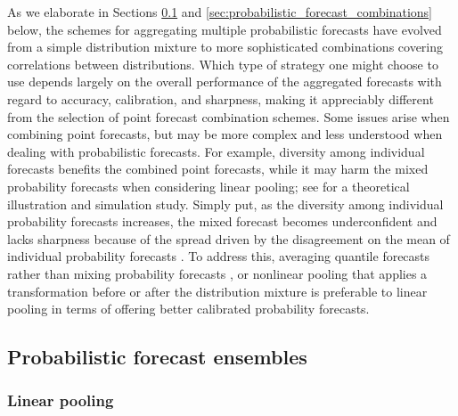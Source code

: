 \documentclass[11pt]{article}
\begin{document}
As we elaborate in Sections \ref{sec:probabilistic_forecast_ensembles} and \ref{sec:probabilistic_forecast_combinations} below, the schemes for aggregating multiple probabilistic forecasts have evolved from a simple distribution mixture to more sophisticated combinations covering correlations between distributions. Which type of strategy one might choose to use depends largely on the overall performance of the aggregated forecasts with regard to accuracy, calibration, and sharpness, making it appreciably different from the selection of point forecast combination schemes. Some issues arise when combining point forecasts, but may be more complex and less understood when dealing with probabilistic forecasts. For example, diversity among individual forecasts benefits the combined point forecasts, while it may harm the mixed probability forecasts when considering linear pooling; see \cite{Ranjan2010-jl} for a theoretical illustration and simulation study. Simply put, as the diversity among individual probability forecasts increases, the mixed forecast becomes underconfident and lacks sharpness because of the spread driven by the disagreement on the mean of individual probability forecasts \citep{Hora2004-fz,Wallis2005-yf,Ranjan2010-jl}. To address this, averaging quantile forecasts rather than mixing probability forecasts \citep{Lichtendahl2013-rt}, or nonlinear pooling that applies a transformation before or after the distribution mixture \citep{Ranjan2010-jl,Gneiting2013-hl} is preferable to linear pooling in terms of offering better calibrated probability forecasts.

\subsection{Probabilistic forecast ensembles}
\label{sec:probabilistic_forecast_ensembles}

\subsubsection{Linear pooling}
\label{sec:linear_pooling}
\end{document}
